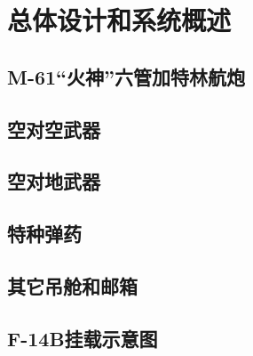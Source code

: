 
\chapter{总体设计和系统概述}

\section{M-61“火神”六管加特林航炮}

\section{空对空武器}

\section{空对地武器}

\section{特种弹药}

\section{其它吊舱和邮箱}

\section{F-14B挂载示意图}